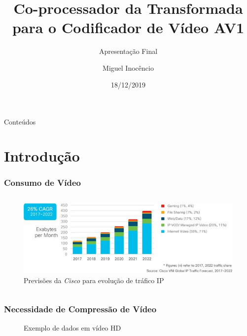 \documentclass{beamer}
\title[Apresentação Final]{Co-processador da Transformada para o Codificador de Vídeo AV1}
\subtitle{Apresentação Final}
\author[M. Inocêncio]{Miguel Inocêncio}
\institute[UA]{Universidade de Aveiro\\ 
				Instituto de Telecomunicações}
\date{18/12/2019}
\begin{document}
\begin{frame}[plain]
	\titlepage
\end{frame}

\begin{frame}{Conteúdos}
	\tableofcontents
\end{frame}

\section{Introdução}

\begin{frame}
	\frametitle{Consumo de Vídeo}
       \begin{columns}
              \column{\textwidth}
                     \begin{figure}[h]
                            \centering
                            \includegraphics[width=\textwidth]{Figures/cisco.jpg}
                            \caption{Previsões da \emph{Cisco} para evolução de tráfico IP}
                            \label{fig:cisco}
                     \end{figure}
       \end{columns}
\end{frame}


\begin{frame}
       \frametitle{Necessidade de Compressão de Vídeo}
       \begin{figure}[h]
              \centering
              
              \caption{Exemplo de dados em vídeo HD}
       \end{figure}
\end{frame}
\end{document}
